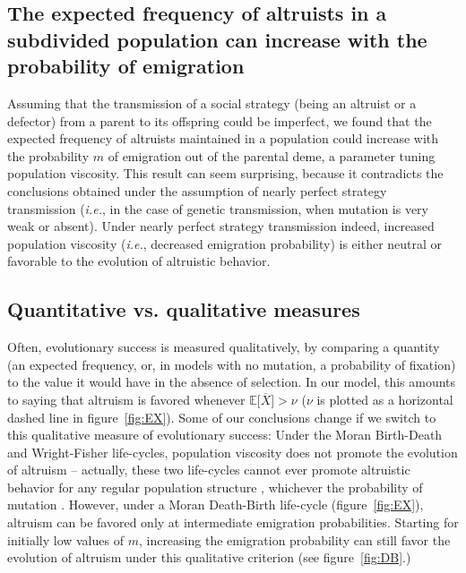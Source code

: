 \documentclass[11pt, letterpaper]{article}
\newcommand{\ie}{\textit{i.e.}}
\newcommand{\Esp}[1]{\mathbb{E}\big[ #1\big]}%
\newcommand{\mutbias}{\nu}
\begin{document}
\subsection*{The expected frequency of altruists in a subdivided population can increase with the probability of emigration}
Assuming that the transmission of a social strategy (being an altruist or a defector) from a parent to its offspring could be imperfect, we found that the expected frequency of altruists maintained in a population could increase with the probability $m$ of emigration out of the parental deme, a parameter tuning population viscosity. This result can seem surprising, because it contradicts the conclusions obtained under the assumption of nearly perfect strategy transmission (\ie, in the case of genetic transmission, when mutation is very weak or absent). Under nearly perfect strategy transmission indeed, increased population viscosity (\ie, decreased emigration probability) is either neutral \citep[][and dashed lines in figures~\ref{fig:EX}--]{Taylor1992islandmodel} or favorable \citep[][and dashed lines in figure~\ref{fig:EX}]{TaylorDayWild2007} to the evolution of altruistic behavior. 

\subsection*{Quantitative vs. qualitative measures}
Often, evolutionary success is measured qualitatively, by comparing a quantity (an expected frequency, or, in models with no mutation, a probability of fixation) to the value it would have in the absence of selection. In our model, this amounts to saying that altruism is favored whenever $\Esp{\overline{X}} > \mutbias$ ($\mutbias$ is plotted as a horizontal dashed line in figure~\ref{fig:EX}). 
Some of our conclusions change if we switch to this qualitative measure of evolutionary success: Under the Moran Birth-Death and Wright-Fisher life-cycles, population viscosity does not promote the evolution of altruism -- actually, these two life-cycles cannot ever promote altruistic behavior for any regular population structure \citep{Taylor2011}, whichever the probability of mutation \citep{Debarre2017}. 
However, under a Moran Death-Birth life-cycle (figure~\ref{fig:EX}), altruism can be favored only at intermediate emigration probabilities. Starting for initially low values of $m$, increasing the emigration probability can still favor the evolution of altruism under this qualitative criterion (see figure~\ref{fig:DB}.)  
\end{document}
